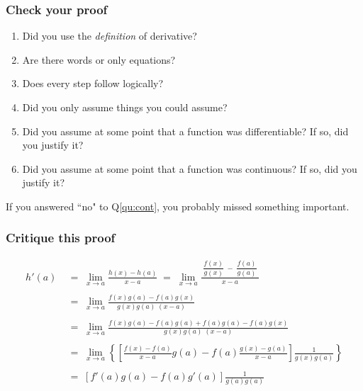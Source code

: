 \begin{frame}[t]
	\frametitle{Check your proof}

	\begin{enumerate}
		\item Did you use the \emph{definition} of derivative?

		\item Are there words or only equations?

		\item Does every step follow logically?

		\item Did you only assume things you could assume?

		\item Did you assume at some point that a function was differentiable? If so,
			did you justify it?

		\item \label{qu:cont} Did you assume at some point that a function was continuous?
			If so, did you justify it?
	\end{enumerate}

	If you answered ``no" to Q\ref{qu:cont}, you probably missed something
	important.
\end{frame}

\begin{frame}[t]
	\fontsize{13}{13}\selectfont
	\frametitle{Critique this proof}
	\vspace{-1cm}
	\begin{align*}
		h'(a) \; & = \; \lim_{x \to a}\frac{h(x) - h(a) }{x - a}\; = \; \lim_{x \to a}\frac{\; \dfrac{f(x)}{g(x)} \; - \; \dfrac{f(a)}{g(a)} \;}{x-a} \\
		\         \\
		         & = \; \lim_{x \to a}\frac{f(x)g(a) - f(a)g(x)}{g(x)g(a) \; (x-a)}                                                                   \\
		\         \\
		         & = \; \lim_{x \to a}\frac{f(x)g(a) - f(a)g(a) + f(a)g(a) - f(a) g(x)}{g(x) g(a) \; (x-a)}                                           \\
		\         \\
		         & = \; \lim_{x \to a}\left\{ \left[ \frac{f(x) - f(a)}{x-a}g(a) - f(a) \frac{g(x) - g(a)}{x-a}\right] \frac{1}{g(x) g(a)}\right\}    \\
		\         \\
		         & = \; \left[ f'(a) g(a) - f(a) g'(a) \right] \frac{1}{g(a) g(a)}
	\end{align*}
\end{frame}


